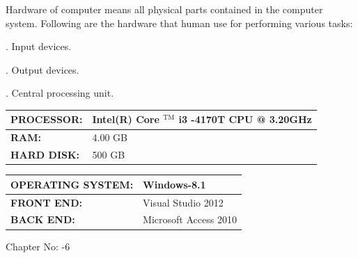 \documentclass{article} %
\begin{document}
\noindent          Hardware of computer means all physical parts contained in the computer system. Following are the hardware that human use for performing various tasks: 

. Input devices. 

. Output devices. 

. Central processing unit. 

\noindent \textbf{}\underbar{}

\begin{tabular}{|p{1.6in}|p{1.8in}|} \hline 
\textbf{ PROCESSOR: } & Intel(R) Core $\mathrm{{}^{TM}}$ i3 -4170T CPU @ 3.20GHz  \\ \hline 
\textbf{RAM: } & 4.00 GB  \\ \hline 
\textbf{HARD DISK: } & 500 GB  \\ \hline 
\end{tabular}

\textbf{}

\noindent \textbf{}\underbar{}

\begin{tabular}{|p{1.1in}|p{1.1in}|} \hline 
\textbf{OPERATING SYSTEM: } & Windows-8.1  \\ \hline 
\textbf{FRONT END: } & Visual Studio 2012  \\ \hline 
\textbf{BACK END: } & Microsoft Access 2010  \\ \hline 
\end{tabular}



\noindent 

\noindent 

\noindent 

\noindent 

\noindent 

\noindent 

\noindent 

\noindent 

\noindent 

\noindent 

\noindent 

\noindent 

\noindent 

\noindent 

\noindent 

\noindent 

\noindent                                                            Chapter No: -6 
\end{document}
